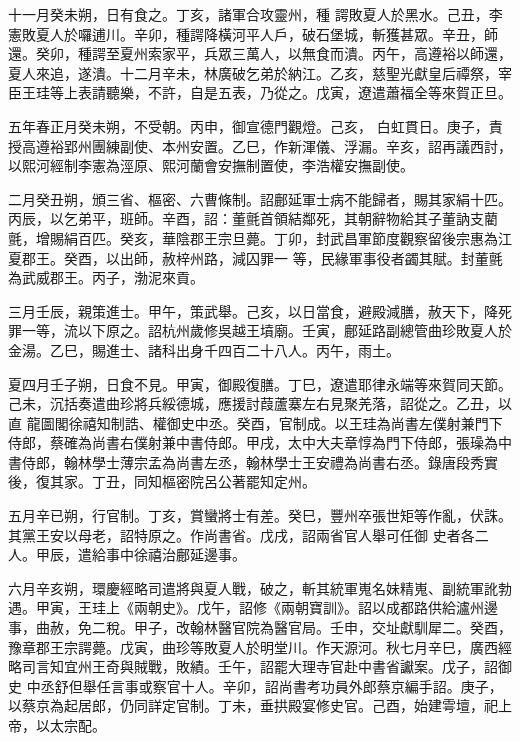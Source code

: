 \begin{pinyinscope}
 十一月癸未朔，日有食之。丁亥，諸軍合攻靈州，種
 諤敗夏人於黑水。己丑，李憲敗夏人於囉逋川。辛卯，種諤降橫河平人戶，破石堡城，斬獲甚眾。辛丑，師還。癸卯，種諤至夏州索家平，兵眾三萬人，以無食而潰。丙午，高遵裕以師還，夏人來追，遂潰。十二月辛未，林廣破乞弟於納江。乙亥，慈聖光獻皇后禫祭，宰臣王珪等上表請聽樂，不許，自是五表，乃從之。戊寅，遼遣蕭福全等來賀正旦。



 五年春正月癸未朔，不受朝。丙申，御宣德門觀燈。己亥，
 白虹貫日。庚子，責授高遵裕郢州團練副使、本州安置。乙巳，作新渾儀、浮漏。辛亥，詔再議西討，以熙河經制李憲為涇原、熙河蘭會安撫制置使，李浩權安撫副使。



 二月癸丑朔，頒三省、樞密、六曹條制。詔鄜延軍士病不能歸者，賜其家絹十匹。丙辰，以乞弟平，班師。辛酉，詔：董氈首領結鄰死，其朝辭物給其子董訥支藺氈，增賜絹百匹。癸亥，華陰郡王宗旦薨。丁卯，封武昌軍節度觀察留後宗惠為江夏郡王。癸酉，以出師，赦梓州路，減囚罪一
 等，民緣軍事役者蠲其賦。封董氈為武威郡王。丙子，渤泥來貢。



 三月壬辰，親策進士。甲午，策武舉。己亥，以日當食，避殿減膳，赦天下，降死罪一等，流以下原之。詔杭州歲修吳越王墳廟。壬寅，鄜延路副總管曲珍敗夏人於金湯。乙巳，賜進士、諸科出身千四百二十八人。丙午，雨土。



 夏四月壬子朔，日食不見。甲寅，御殿復膳。丁巳，遼遣耶律永端等來賀同天節。己未，沉括奏遣曲珍將兵綏德城，應援討葭蘆寨左右見聚羌落，詔從之。乙丑，以直
 龍圖閣徐禧知制誥、權御史中丞。癸酉，官制成。以王珪為尚書左僕射兼門下侍郎，蔡確為尚書右僕射兼中書侍郎。甲戌，太中大夫章惇為門下侍郎，張璪為中書侍郎，翰林學士薄宗孟為尚書左丞，翰林學士王安禮為尚書右丞。錄唐段秀實後，復其家。丁丑，同知樞密院呂公著罷知定州。



 五月辛已朔，行官制。丁亥，賞蠻將士有差。癸巳，豐州卒張世矩等作亂，伏誅。其黨王安以母老，詔特原之。作尚書省。戊戌，詔兩省官人舉可任御
 史者各二人。甲辰，遣給事中徐禧治鄜延邊事。



 六月辛亥朔，環慶經略司遣將與夏人戰，破之，斬其統軍嵬名妹精嵬、副統軍訛勃遇。甲寅，王珪上《兩朝史》。戊午，詔修《兩朝寶訓》。詔以成都路供給瀘州邊事，曲赦，免二稅。甲子，改翰林醫官院為醫官局。壬申，交址獻馴犀二。癸酉，豫章郡王宗諤薨。戊寅，曲珍等敗夏人於明堂川。作天源河。秋七月辛巳，廣西經略司言知宜州王奇與賊戰，敗績。壬午，詔罷大理寺官赴中書省讞案。戊子，詔御史
 中丞舒但舉任言事或察官十人。辛卯，詔尚書考功員外郎蔡京編手詔。庚子，以蔡京為起居郎，仍同詳定官制。丁未，垂拱殿宴修史官。己酉，始建雩壇，祀上帝，以太宗配。




\end{pinyinscope}
